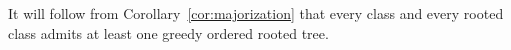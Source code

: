 \documentclass[11 pt]{modarticle}
\newcommand{\size}[1]{|#1|}
\newcommand{\ldtodo}[1]{\textcolor{blue}{{\footnotesize [TODO Loïc]} #1}}
\begin{document}
It will follow from Corollary~\ref{cor:majorization} that every class and every rooted class admits at least one greedy ordered rooted tree.

\end{document}
